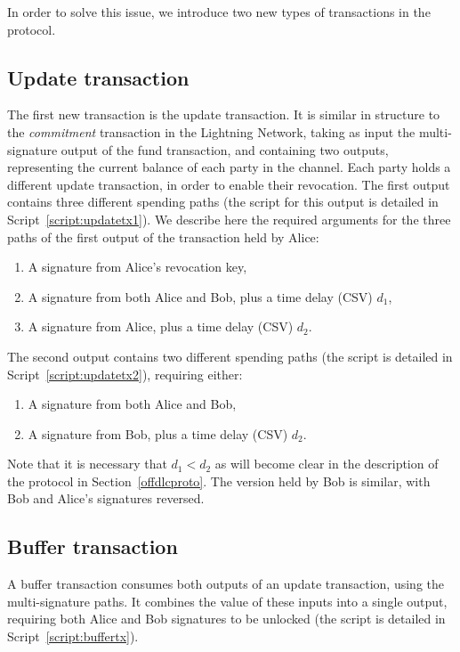 In order to solve this issue, we introduce two new types of transactions in the protocol.

\subsection{Update transaction}
The first new transaction is the update transaction.
It is similar in structure to the \emph{commitment} transaction in the Lightning Network, taking as input the multi-signature output of the fund transaction, and containing two outputs, representing the current balance of each party in the channel.
Each party holds a different update transaction, in order to enable their revocation.
The first output contains three different spending paths (the script for this output is detailed in Script~\ref{script:updatetx1}). 
We describe here the required arguments for the three paths of the first output of the transaction held by Alice:
\begin{enumerate}
  \item A signature from Alice's revocation key, 
  \item A signature from both Alice and Bob, plus a time delay (CSV) $d_1$,
  \item A signature from Alice, plus a time delay (CSV) $d_2$.
\end{enumerate}

The second output contains two different spending paths (the script is detailed in Script~\ref{script:updatetx2}), requiring either:
\begin{enumerate}
  \item A signature from both Alice and Bob,
  \item A signature from Bob, plus a time delay (CSV) $d_2$.
\end{enumerate}

Note that it is necessary that $d_1 < d_2$ as will become clear in the description of the protocol in Section~\ref{offdlcproto}.
The version held by Bob is similar, with Bob and Alice's signatures reversed.

\subsection{Buffer transaction}
A buffer transaction consumes both outputs of an update transaction, using the multi-signature paths.
It combines the value of these inputs into a single output, requiring both Alice and Bob signatures to be unlocked (the script is detailed in Script~\ref{script:buffertx}).

